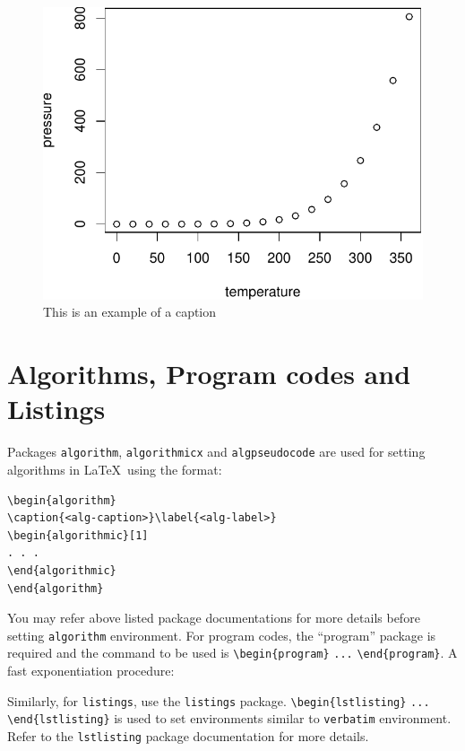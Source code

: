 \documentclass[sn-basic,pdflatex]{sn-jnl}
\theoremstyle{remark}
\theoremstyle{definition}
\begin{document}
\begin{figure}
\includegraphics{Laboratory-Notebook_files/figure-latex/fig1-1} \caption{This is an example of a caption}\label{fig:fig1}
\end{figure}

\section{Algorithms, Program codes and Listings}\label{sec7}

Packages \texttt{algorithm}, \texttt{algorithmicx} and
\texttt{algpseudocode} are used for setting algorithms in \LaTeX~using
the format:

\begin{verbatim}
\begin{algorithm}
\caption{<alg-caption>}\label{<alg-label>}
\begin{algorithmic}[1]
. . .
\end{algorithmic}
\end{algorithm}
\end{verbatim}

You may refer above listed package documentations for more details
before setting \texttt{algorithm} environment. For program codes, the
``program'' package is required and the command to be used is
\texttt{\textbackslash{}begin\{program\}} \texttt{...}
\texttt{\textbackslash{}end\{program\}}. A fast exponentiation
procedure:

Similarly, for \texttt{listings}, use the \texttt{listings} package.
\texttt{\textbackslash{}begin\{lstlisting\}} \texttt{...}
\texttt{\textbackslash{}end\{lstlisting\}} is used to set environments
similar to \texttt{verbatim} environment. Refer to the
\texttt{lstlisting} package documentation for more details.
\end{document}
